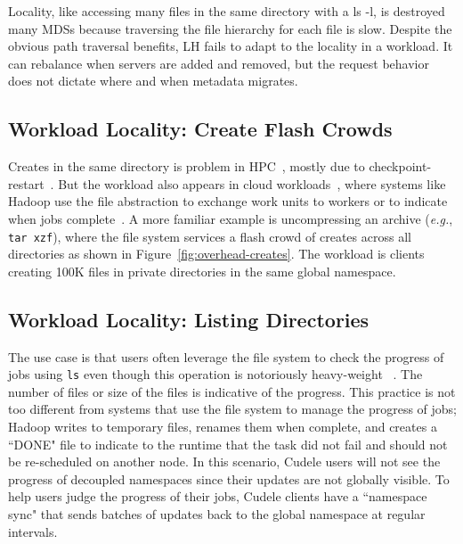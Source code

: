 Locality, like accessing many files in the same directory with a ls -l, is
destroyed many MDSs because traversing the file hierarchy for each file is
slow. Despite the obvious path traversal benefits, LH fails to adapt to the
locality in a workload. It can rebalance when servers are added and removed,
but the request behavior does not dictate where and when metadata migrates.

\subsection{Workload Locality: Create Flash Crowds}

Creates in the same directory is problem in HPC~\cite{weil:sc2004-dyn-metadata,
ren:sc2014-indexfs, patil:fast2011-giga, zheng:pdsw2014-batchfs,
sevilla:sc15-mantle}, mostly due to checkpoint-restart~\cite{bent_plfs_2009}.
But the workload also appears in cloud workloads~\cite{xiao:socc15-shardfs},
where systems like Hadoop use the file abstraction to exchange work units to
workers or to indicate when jobs
complete~\cite{shvachko:login2012-hdfs-scalability}. A more familiar example is
uncompressing an archive ({\it e.g.}, \texttt{tar xzf}), where the file system
services a flash crowd of creates across all directories as shown in
Figure~\ref{fig:overhead-creates}.  The workload is clients creating 100K files
in private directories in the same global namespace.


\subsection{Workload Locality: Listing Directories}

The use case is that users often leverage the file system to check the progress
of jobs using \texttt{ls} even though this operation is notoriously
heavy-weight~\cite{carns:ipdps09-pvfs, eshel:fast10-panache} . The number of
files or size of the files is indicative of the progress. This practice is not
too different from systems that use the file system to manage the progress of
jobs; Hadoop writes to temporary files, renames them when complete, and creates
a ``DONE" file to indicate to the runtime that the task did not fail and should
not be re-scheduled on another node. In this scenario, Cudele users will not
see the progress of decoupled namespaces since their updates are not globally
visible.  To help users judge the progress of their jobs, Cudele clients have a
``namespace sync" that sends batches of updates back to the global namespace at
regular intervals.


